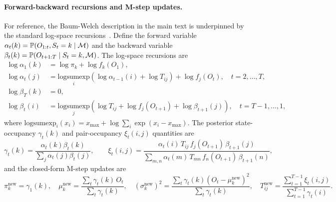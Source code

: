 \paragraph{Forward-backward recursions and M-step updates.}
For reference, the Baum-Welch description in the main text is underpinned by the standard log-space recursions~\cite{rabiner1986introduction, bilmes1998gentle}.
Define the forward variable $\alpha_t(k) = \mathbb{P}(O_{1:t}, S_t = k \mid \mathcal{M})$ and the backward variable $\beta_t(k) = \mathbb{P}(O_{t+1:T} \mid S_t = k, \mathcal{M})$.
The log-space recursions are
\begin{align}
    \log \alpha_1(k) &= \log \pi_k + \log f_k(O_1), \label{eq:forward_init} \\
    \log \alpha_t(j) &= \underset{i}{\text{logsumexp}}\!\left(\log \alpha_{t-1}(i) + \log T_{ij}\right) + \log f_j(O_t), \quad t = 2, \ldots, T, \label{eq:forward} \\[4pt]
    \log \beta_T(k) &= 0, \label{eq:backward_init} \\
    \log \beta_t(i) &= \underset{j}{\text{logsumexp}}\!\left(\log T_{ij} + \log f_j(O_{t+1}) + \log \beta_{t+1}(j)\right), \quad t = T{-}1, \ldots, 1, \label{eq:backward}
\end{align}
where $\text{logsumexp}_i(x_i) = x_{\max} + \log \sum_i \exp(x_i - x_{\max})$.
The posterior state-occupancy $\gamma_t(k)$ and pair-occupancy $\xi_t(i, j)$ quantities are
\begin{equation}
    \gamma_t(k) = \frac{\alpha_t(k) \beta_t(k)}{\sum_j \alpha_t(j) \beta_t(j)}, \qquad
    \xi_t(i, j) = \frac{\alpha_t(i)\, T_{ij}\, f_j(O_{t+1})\, \beta_{t+1}(j)}{\sum_{m,n} \alpha_t(m)\, T_{mn}\, f_n(O_{t+1})\, \beta_{t+1}(n)},
    \label{eq:gamma_xi}
\end{equation}
and the closed-form M-step updates are
\begin{equation}
    \pi_k^{\text{new}} = \gamma_1(k),\quad
    \mu_k^{\text{new}} = \frac{\sum_t \gamma_t(k)\, O_t}{\sum_t \gamma_t(k)},\quad
    \left(\sigma_k^{\text{new}}\right)^2 = \frac{\sum_t \gamma_t(k)(O_t - \mu_k^{\text{new}})^2}{\sum_t \gamma_t(k)},\quad
    T_{ij}^{\text{new}} = \frac{\sum_{t=1}^{T-1} \xi_t(i, j)}{\sum_{t=1}^{T-1} \gamma_t(i)}.
    \label{eq:mstep}
\end{equation}
